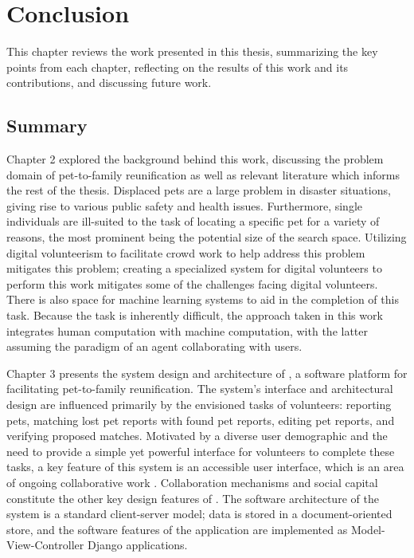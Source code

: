 \chapter{Conclusion}
\label{conclusion}

This chapter reviews the work presented in this thesis, summarizing the key points from each chapter, reflecting on the results of this work and its contributions, and discussing future work.

\section {Summary}

Chapter 2 explored the background behind this work, discussing the problem domain of pet-to-family reunification as well as relevant literature which informs the rest of the thesis.  Displaced pets are a large problem in disaster situations, giving rise to various public safety and health issues.  Furthermore, single individuals are ill-suited to the task of locating a specific pet for a variety of reasons, the most prominent being the potential size of the search space.  Utilizing digital volunteerism to facilitate crowd work to help address this problem mitigates this problem; creating a specialized system for digital volunteers to perform this work mitigates some of the challenges facing digital volunteers.  There is also space for machine learning systems to aid in the completion of this task.  Because the task is inherently difficult, the approach taken in this work integrates human computation with machine computation, with the latter assuming the paradigm of an agent collaborating with users.

Chapter 3 presents the system design and architecture of \nplh{}, a software platform for facilitating pet-to-family reunification.  The system's interface and architectural design are influenced primarily by the envisioned tasks of volunteers: reporting pets, matching lost pet reports with found pet reports, editing pet reports, and verifying proposed matches.  Motivated by a diverse user demographic and the need to provide a simple yet powerful interface for volunteers to complete these tasks, a key feature of this system is an accessible user interface, which is an area of ongoing collaborative work \cite{sdc}.  Collaboration mechanisms and social capital constitute the other key design features of \nplh.  The software architecture of the system is a standard client-server model; data is stored in a document-oriented store, and the software features of the application are implemented as Model-View-Controller Django applications.

